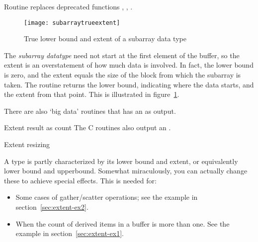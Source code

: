 \begin{remark}
  Routine 
  replaces
  deprecated functions ,
  , .
\end{remark}

\begin{figure}[ht]
  \texttt{[image: subarraytrueextent]}
  \caption{True lower bound and extent of a subarray data type}
  \label{fig:subtrue}
\end{figure}

The \emph{subarray datatype} need not
start at the first element of the buffer, so the extent is an
overstatement of how much data is involved.
In fact, the lower bound is zero,
and the extent equals the size of the block
from which the subarray is taken.
The routine
 returns the lower bound,
indicating where the data starts, and the extent from that point.
This is illustrated in figure~\ref{fig:subtrue}.


\begin{comment}
  Suppose we implement gather (see also Section Gather ) as a spanning
  tree implemented on top of point-to-point routines. Since the receive
  buffer is only valid on the root process, one will need to allocate
  some temporary space for receiving data on intermediate
  nodes. However, the datatype extent cannot be used as an estimate of
  the amount of space that needs to be allocated, if the user has
  modified the extent, for example by using MPI_TYPE_CREATE_RESIZED. The
  functions MPI_TYPE_GET_TRUE_EXTENT and MPI_TYPE_GET_TRUE_EXTENT_X are
  provided which return the true extent of the datatype.
\end{comment}

There are also `big data' routines
that has an  as output.

\begin{mpifournote}{Extent result as count}
  The C routines
  also output an .
\end{mpifournote}

 {Extent resizing}

A type is partly characterized by its lower bound and extent,
or equivalently lower bound and upperbound.
Somewhat miraculously, you can actually change these to achieve special effects.
This is needed for:
\begin{itemize}
\item
  Some cases of gather/scatter operations;
  see the example in section~\ref{sec:extent-ex2}.

\item When the count
  of derived items in a buffer is more than one.
  See the example in section~\ref{sec:extent-ex1}.
\end{itemize}


